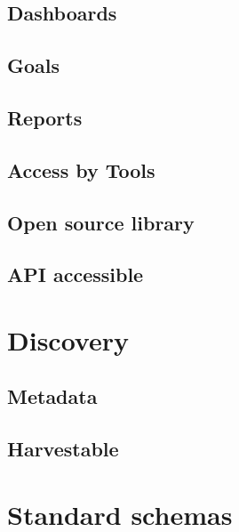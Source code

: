 \documentclass[
]{book}
\begin{document}
\hypertarget{dashboards-1}{%
\subsection{Dashboards}\label{dashboards-1}}

\hypertarget{goals}{%
\subsection{Goals}\label{goals}}

\hypertarget{reports-1}{%
\subsection{Reports}\label{reports-1}}

\hypertarget{access-by-tools}{%
\subsection{Access by Tools}\label{access-by-tools}}

\hypertarget{open-source-library}{%
\subsection{Open source library}\label{open-source-library}}

\hypertarget{api-accessible}{%
\subsection{API accessible}\label{api-accessible}}

\hypertarget{discovery}{%
\section{Discovery}\label{discovery}}

\hypertarget{metadata}{%
\subsection{Metadata}\label{metadata}}

\hypertarget{harvestable}{%
\subsection{Harvestable}\label{harvestable}}

\hypertarget{standard-schemas}{%
\section{Standard schemas}\label{standard-schemas}}
\end{document}
